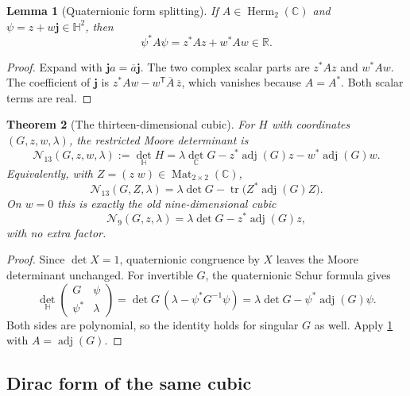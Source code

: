 \documentclass[11pt]{article}
\newtheorem{theorem}{Theorem}[section]
\newtheorem{lemma}[theorem]{Lemma}
\theoremstyle{definition}
\theoremstyle{remark}
\newcommand{\C}{\mathbb C}
\newcommand{\Hh}{\mathbb H}
\newcommand{\R}{\mathbb R}
\newcommand{\Herm}{\operatorname{Herm}}
\newcommand{\Mat}{\operatorname{Mat}}
\newcommand{\tr}{\operatorname{tr}}
\newcommand{\adj}{\operatorname{adj}}
\newcommand{\cN}{\mathcal N}
\newcommand{\bj}{\mathbf j}
\begin{document}
\begin{lemma}[Quaternionic form splitting]\label{lem:qsplit}
If $A\in\Herm_2(\C)$ and $\psi=z+w\bj\in\Hh^2$, then
\begin{equation}\label{eq:qsplit}
 \boxed{\psi^*A\psi=z^*Az+w^*Aw\in\R.}
\end{equation}
\end{lemma}

\begin{proof}
Expand with $\bj a=\overline a\bj$.  The two complex scalar parts are $z^*Az$ and $w^*Aw$.  The coefficient of $\bj$ is
$z^*Aw-w^{\mathsf T}\overline A\,\overline z$, which vanishes because $A=A^*$.  Both scalar terms are real.
\end{proof}

\begin{theorem}[The thirteen-dimensional cubic]\label{thm:cubic}
For $H$ with coordinates $(G,z,w,\lambda)$, the restricted Moore determinant is
\begin{equation}\label{eq:N13}
 \boxed{
 \cN_{13}(G,z,w,\lambda)
 :=\det_{\Hh}H
 =\lambda\det_{\C}G
  -z^*\adj(G)z
  -w^*\adj(G)w.}
\end{equation}
Equivalently, with $Z=(z\;w)\in\Mat_{2\times2}(\C)$,
\begin{equation}\label{eq:N13-trace}
 \cN_{13}(G,Z,\lambda)
 =\lambda\det G-\tr\bigl(Z^*\adj(G)Z\bigr).
\end{equation}
On $w=0$ this is exactly the old nine-dimensional cubic
\begin{equation}\label{eq:N9}
 \cN_9(G,z,\lambda)=\lambda\det G-z^*\adj(G)z,
\end{equation}
with no extra factor.
\end{theorem}

\begin{proof}
Since $\det X=1$, quaternionic congruence by $X$ leaves the Moore determinant unchanged.  For invertible $G$, the quaternionic Schur formula gives
\[
 \det_{\Hh}
 \begin{pmatrix}G&\psi\\\psi^*&\lambda\end{pmatrix}
 =\det G\,(\lambda-\psi^*G^{-1}\psi)
 =\lambda\det G-\psi^*\adj(G)\psi.
\]
Both sides are polynomial, so the identity holds for singular $G$ as well.  Apply \cref{lem:qsplit} with $A=\adj(G)$.
\end{proof}

\subsection{Dirac form of the same cubic}
\end{document}
